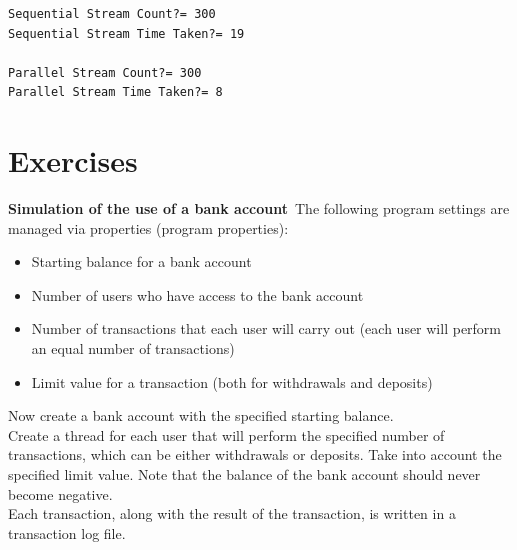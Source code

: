 \begin{verbatim}
Sequential Stream Count?= 300
Sequential Stream Time Taken?= 19

Parallel Stream Count?= 300
Parallel Stream Time Taken?= 8
\end{verbatim}

\section{Exercises}

\begin{oefening}
\textbf{Simulation of the use of a bank account}\
The following program settings are managed via properties (program properties):
\begin{itemize}
\item Starting balance for a bank account
\item Number of users who have access to the bank account
\item Number of transactions that each user will carry out (each user will perform an equal number of transactions)
\item Limit value for a transaction (both for withdrawals and deposits)
\end{itemize}

Now create a bank account with the specified starting balance.\\
Create a thread for each user that will perform the specified number of transactions, which can be either withdrawals or deposits. Take into account the specified limit value. Note that the balance of the bank account should never become negative.\\
Each transaction, along with the result of the transaction, is written in a transaction log file.
\end{oefening}


